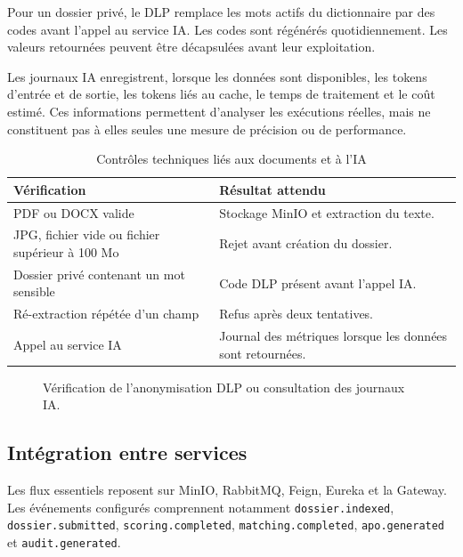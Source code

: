 Pour un dossier privé, le DLP remplace les mots actifs du dictionnaire par des codes avant l'appel au service IA. Les codes sont régénérés quotidiennement. Les valeurs retournées peuvent être décapsulées avant leur exploitation.

Les journaux IA enregistrent, lorsque les données sont disponibles, les tokens d'entrée et de sortie, les tokens liés au cache, le temps de traitement et le coût estimé. Ces informations permettent d'analyser les exécutions réelles, mais ne constituent pas à elles seules une mesure de précision ou de performance.

\begin{table}[H]
\centering
\caption{Contrôles techniques liés aux documents et à l'IA}
\label{tab:controles-documents-ia}
\begin{tabularx}{\textwidth}{p{5.5cm}Y}
\toprule
\textbf{Vérification} & \textbf{Résultat attendu} \\
\midrule
PDF ou DOCX valide & Stockage MinIO et extraction du texte. \\
JPG, fichier vide ou fichier supérieur à 100 Mo & Rejet avant création du dossier. \\
Dossier privé contenant un mot sensible & Code DLP présent avant l'appel IA. \\
Ré-extraction répétée d'un champ & Refus après deux tentatives. \\
Appel au service IA & Journal des métriques lorsque les données sont retournées. \\
\bottomrule
\end{tabularx}
\end{table}

\begin{figure}[H]
\centering
\vspace{5cm}
\caption{Vérification de l'anonymisation DLP ou consultation des journaux IA.}
\label{fig:dlp-ia}
\end{figure}

\subsection{Intégration entre services}

Les flux essentiels reposent sur MinIO, RabbitMQ, Feign, Eureka et la Gateway. Les événements configurés comprennent notamment \texttt{dossier.indexed}, \texttt{dossier.submitted}, \texttt{scoring.completed}, \texttt{matching.completed}, \texttt{apo.generated} et \texttt{audit.generated}.

